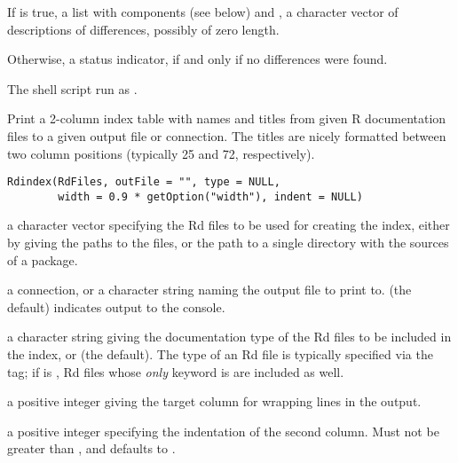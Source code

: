 %
\begin{Value}
If  is true, a list with components  (see
below) and , a character vector of descriptions of
differences, possibly of zero length.

Otherwise, a status indicator,  if and only if no differences
were found.
\end{Value}
%
\begin{SeeAlso}\relax
The shell script run as .
\end{SeeAlso}
%
\begin{Description}\relax
Print a 2-column index table with names and titles from given
R documentation files to a given output file or connection.  The
titles are nicely formatted between two column positions (typically 25
and 72, respectively).
\end{Description}
%
\begin{Usage}
\begin{verbatim}
Rdindex(RdFiles, outFile = "", type = NULL,
        width = 0.9 * getOption("width"), indent = NULL)
\end{verbatim}
\end{Usage}
%
\begin{Arguments}
\begin{ldescription}
\item[\code{RdFiles}] a character vector specifying the Rd files to be used
for creating the index, either by giving the paths to the files, or
the path to a single directory with the sources of a package.
\item[\code{outFile}] a connection, or a character string naming the output
file to print to.   (the default) indicates output to the
console.
\item[\code{type}] a character string giving the documentation type of the Rd
files to be included in the index, or  (the default).
The type of an Rd file is typically specified via the
 tag; if  is , Rd files
whose \emph{only} keyword is  are included as well.
\item[\code{width}] a positive integer giving the target column for wrapping
lines in the output.
\item[\code{indent}] a positive integer specifying the indentation of the
second column.  Must not be greater than , and
defaults to .
\end{ldescription}
\end{Arguments}
